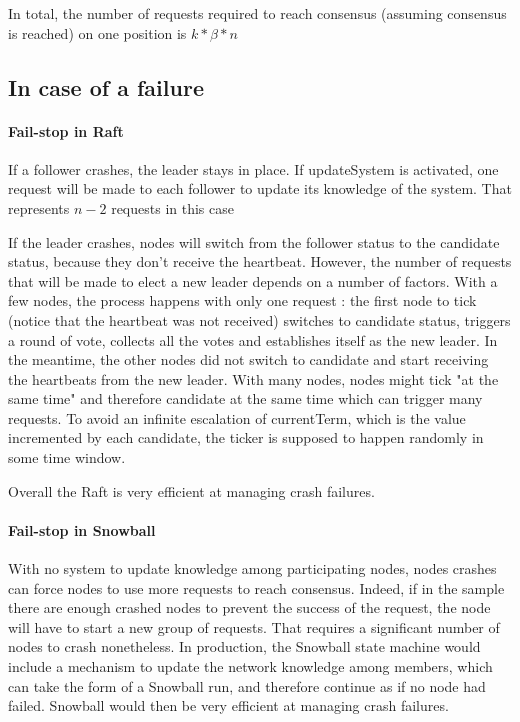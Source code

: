 \documentclass[11pt, twocolumn]{article}
\begin{document}
In total, the number of requests required to reach consensus (assuming consensus is reached) on one position is $k*\beta*n$
\subsection{In case of a failure}
\paragraph{Fail-stop in Raft}
If a follower crashes, the leader stays in place. If updateSystem is activated, one request will be made to each follower to update its knowledge of the system. That represents $n-2$ requests in this case

If the leader crashes, nodes will switch from the follower status to the candidate status, because they don't receive the heartbeat.
However, the number of requests that will be made to elect a new leader depends on a number of factors.
With a few nodes, the process happens with only one request : the first node to tick (notice that the heartbeat was not received) switches to candidate status, triggers a round of vote, collects all the votes and establishes itself as the new leader.
In the meantime, the other nodes did not switch to candidate and start receiving the heartbeats from the new leader.
With many nodes, nodes might tick "at the same time" and therefore candidate at the same time which can trigger many requests. To avoid an infinite escalation of currentTerm, which is the value incremented by each candidate, the ticker is supposed to happen randomly in some time window.

Overall the Raft is very efficient at managing crash failures.

\paragraph{Fail-stop in Snowball}
With no system to update knowledge among participating nodes, nodes crashes can force nodes to use more requests to reach consensus. 
Indeed, if in the sample there are enough crashed nodes to prevent the success of the request, the node will have to start a new group of requests. That requires a significant number of nodes to crash nonetheless.
In production, the Snowball state machine would include a mechanism to update the network knowledge among members, which can take the form of a Snowball run, and therefore continue as if no node had failed.
Snowball would then be very efficient at managing crash failures.
\end{document}
